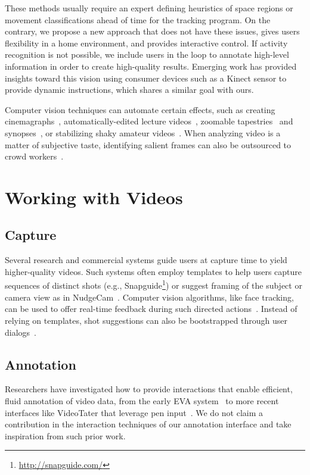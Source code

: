 These methods usually require an expert defining heuristics of space regions or movement classifications ahead of time for the tracking program.
%
On the contrary, we propose a new approach that does not have these issues, gives users flexibility in a home environment, and provides interactive control. If activity recognition is not possible, we include users in the loop to annotate high-level information in order to create high-quality results.
%
Emerging work has provided insights toward this vision using consumer devices such as a Kinect sensor \cite{Anderson:2013:YEM:2501988.2502045,Gupta:2012ku} to provide dynamic instructions, which shares a similar goal with ours.

Computer vision techniques can automate certain effects, such as creating cinemagraphs~\cite{Bai:2012, Joshi:2012}, automatically-edited lecture videos~\cite{Heck:2007}, zoomable tapestries~\cite{Barnes:2010} and synopses~\cite{Pritch:2009vl}, or stabilizing shaky amateur videos~\cite{Liu:2011}. When analyzing video is a matter of subjective taste, identifying salient frames can also be outsourced to crowd workers~\cite{Bernstein:2011uj}.


\section{Working with Videos}

\subsection{Capture}
Several research and commercial systems guide users at capture time to yield higher-quality videos. Such systems often employ templates to help users capture sequences of distinct shots (e.g., Snapguide\footnote{\url{http://snapguide.com/}}) or suggest framing of the subject or camera view as in NudgeCam~\cite{Carter:2010}. Computer vision algorithms, like face tracking, can be used to offer real-time feedback during such directed actions~\cite{Davis:2003cu,Heer:2004ba,Carter:2010}. Instead of relying on templates, shot suggestions can also be bootstrapped through user dialogs~\cite{Adams:2005}.

\subsection{Annotation}
Researchers have investigated how to provide interactions that enable efficient, fluid annotation of video data, from the early EVA system~\cite{Mackay:1989} to more recent interfaces like VideoTater that leverage pen input~\cite{Diakopoulos:2006vt}. We do not claim a contribution in the interaction techniques of our annotation interface and take inspiration from such prior work.

